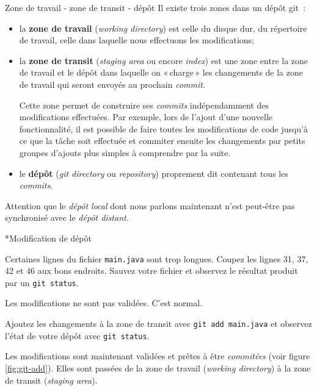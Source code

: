 \documentclass[a4paper,11pt]{style-esi/td}
\begin{document}
\begin{theorie}{Zone de travail - zone de transit - dépôt}
	Il existe trois zones dans un dépôt git : 
	\begin{itemize}
		\item la \textbf{zone de travail} (\textit{working directory}) est celle 
			du disque dur, du répertoire de travail, celle dans laquelle nous 
			effectuons les modifications;

		\item la \textbf{zone de transit} (\textit{staging area} ou encore
			\textit{index}) est une zone entre la zone de travail et le dépôt
			dans laquelle on « charge » les changements de la zone de travail
			qui seront envoyés au prochain \textit{commit}.

			Cette zone permet de construire ses \textit{commits} indépendamment
			des modifications effectuées. Par exemple, lors de l'ajout d'une
			nouvelle fonctionnalité, il est possible de faire toutes les
			modifications de code jusqu'à ce que la tâche soit effectuée et
			commiter ensuite les changements par petits groupes d'ajouts plus
			simples à comprendre par la suite. 

		\item le \textbf{dépôt} (\textit{git directory} ou \textit{repository})
			proprement dit contenant tous les \textit{commits}. 
	
	\end{itemize}

	Attention que le \textit{dépôt local} dont nous parlons maintenant 
	n'est peut-être pas synchronisé avec le \textit{dépôt distant}. 
	
\end{theorie}

\begin{Exercice}*{Modification de dépôt}
	\begin{steps}
		
	\item Certaines lignes du fichier \texttt{main.java} sont trop longues.
		Coupez les lignes 31, 37, 42 et 46 aux bons endroits. Sauvez votre
		fichier et observez le résultat produit par un \texttt{git status}.

		Les modifications ne sont pas validées. C'est normal. 

	\item Ajoutez les changements à la zone de transit avec \texttt{git add
		main.java} et observez l'état de votre dépôt avec \texttt{git status}.

		Les modifications sont maintenant validées et prêtes à être
		\textit{commitées} (voir figure \vref{fig:git-add}). Elles sont passées 
		de la zone de travail (\textit{working directory}) à la zone de transit
		(\textit{staging area}).

	\end{steps}
\end{Exercice}
\end{document}
